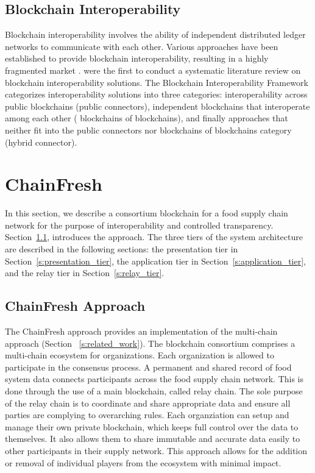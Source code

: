 \documentclass[conference]{IEEEtran}
\begin{document}
\subsection{Blockchain Interoperability} \label{s:blockchain_interoperability}
Blockchain interoperability involves the ability of independent distributed ledger networks to communicate with each other. Various approaches have been established to provide blockchain interoperability, resulting in a highly fragmented market \cite{belchior2021survey}.   were the first to conduct a systematic literature review on blockchain interoperability solutions. The Blockchain Interoperability Framework \citeauthor{belchior2021survey} categorizes interoperability solutions into three categories: interoperability across public blockchains (public connectors),  independent blockchains that interoperate among each other ( blockchains of blockchains), and finally approaches that neither fit into the public connectors nor blockchains of blockchains category (hybrid connector). 

\section{ChainFresh} \label{s:chainFresh}
In this section, we describe a consortium blockchain for a food supply chain network for the purpose of interoperability and controlled transparency. Section~\ref{s:chainfresh_approach}, introduces the approach. The three tiers of the system architecture are described in the following sections: the presentation tier in Section~\ref{s:presentation_tier},  the application tier in Section~\ref{s:application_tier}, and the relay tier in Section~\ref{s:relay_tier}.

\subsection{ChainFresh Approach} \label{s:chainfresh_approach}
The ChainFresh approach provides an implementation of the multi-chain approach (Section~ \ref{s:related_work}). The blockchain consortium comprises a multi-chain ecosystem for organizations. Each organization is allowed to participate in the consensus process. 
A permanent and shared record of food system data connects participants across the food supply chain network. This is done through the use of a main blockchain, called relay chain. The sole purpose of the relay chain is to coordinate and share appropriate data and ensure all parties are complying to overarching rules. Each organziation can setup and manage their own private blockchain, which keeps full control over the data to themselves. It also allows them to share immutable and accurate data easily to other participants in their supply network. This approach allows for the addition or removal of individual players from the ecosystem with minimal impact.
\end{document}
